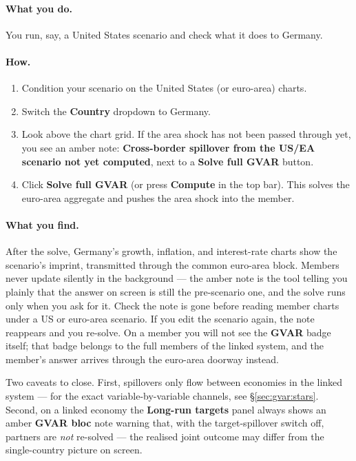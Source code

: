 \documentclass[11pt]{article}
\theoremstyle{definition}
\theoremstyle{remark}
\begin{document}
\paragraph{What you do.} You run, say, a United States scenario and check what
it does to Germany.

\paragraph{How.}
\begin{enumerate}
  \item Condition your scenario on the United States (or euro-area) charts.
  \item Switch the \textbf{Country} dropdown to Germany.
  \item Look above the chart grid. If the area shock has not been passed
    through yet, you see an amber note: \textbf{Cross-border spillover from the
    US/EA scenario not yet computed}, next to a
    \textbf{Solve full GVAR} button.
  \item Click \textbf{Solve full GVAR} (or press \textbf{Compute}
    in the top bar). This solves the euro-area aggregate and pushes the area
    shock into the member.
\end{enumerate}

\paragraph{What you find.} After the solve, Germany's growth, inflation, and
interest-rate charts show the scenario's imprint, transmitted through the common
euro-area block. Members never update silently in the background --- the amber
note is the tool telling you plainly that the answer on screen is still the
pre-scenario one, and the solve runs only when you ask for it. Check the note is
gone before reading member charts under a US or euro-area scenario. If you edit
the scenario again, the note reappears and you re-solve. On a member you will
not see the \textbf{GVAR} badge itself; that badge belongs to the full members
of the linked system, and the member's answer arrives through the euro-area
doorway instead.

Two caveats to close. First, spillovers only flow between economies in
the linked system --- for the exact variable-by-variable channels, see
\S\ref{sec:gvar:stars}. Second, on a linked economy the \textbf{Long-run
targets} panel always shows an amber \textbf{GVAR bloc} note warning that, with
the target-spillover switch off, partners are \emph{not} re-solved --- the
realised joint outcome may differ from the single-country picture on screen.
\end{document}

